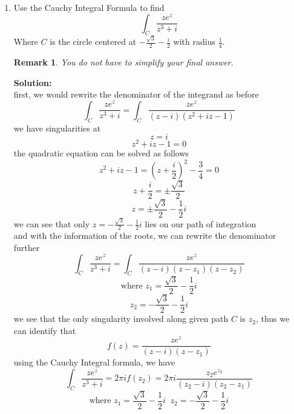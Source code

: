 \documentclass[12pt]{article}
\newtheorem*{remark}{Remark}
\begin{document}
\begin{enumerate}
    
 \item Use the Cauchy Integral Formula to find 
 \[
 \int_{C} \frac{ze^{z}}{z^{3} + i}
 \]
 Where $C$ is the circle centered at $-\frac{\sqrt{3}}{2} -  \frac{i}{2}$ with radius $\frac{1}{4}$. 

\begin{remark}
    You do not have to simplify your final answer.  
\end{remark}
\textbf{Solution:}\\
first, we would rewrite the denominator of the integrand as before
\[
\int_{C} \frac{ze^{z}}{z^{3} + i} = \int_{C} \frac{ze^{z}}{(z-i)(z^2+iz-1)}
\]
we have singularities at
\[
z=i
\]
\[
z^2+iz-1=0
\]
the quadratic equation can be solved as follows
\[
z^2+iz-1=(z+\frac{i}{2})^2-\frac{3}{4}=0
\]
\[
z+\frac{i}{2}=\pm \frac{\sqrt{3}}{2}
\]
\[
z=\pm \frac{\sqrt{3}}{2} - \frac{1}{2}i
\]
we can see that only $z=-\frac{\sqrt{3}}{2} - \frac{1}{2}i$ lies on our path of integration
\\
and with the information of the roots, we can rewrite the denominator further
\[
\int_{C} \frac{ze^{z}}{z^{3} + i} = \int_{C} \frac{ze^{z}}{(z-i)(z-z_1)(z-z_2)}
\]
\[
\text{where }z_1=\frac{\sqrt{3}}{2} - \frac{1}{2}i
\]
\[
z_2= -\frac{\sqrt{3}}{2} - \frac{1}{2}i
\]
we see that the only singularity involved along given path $C$ is $z_2$, thus we can identify that
\[
f(z)=\frac{ze^z}{(z-i)(z-z_1)}
\]
using the Cauchy Integral formula, we have
\[
 \int_{C} \frac{ze^{z}}{z^{3} + i} = 2\pi i f(z_2) =2\pi i \frac{z_2e^{z_2}}{(z_2-i)(z_2-z_1)}
\]
\[
\text{where }z_1=\frac{\sqrt{3}}{2} - \frac{1}{2}i \;\; z_2 = -\frac{\sqrt{3}}{2} - \frac{1}{2}i
\]


\end{enumerate}
\end{document}
